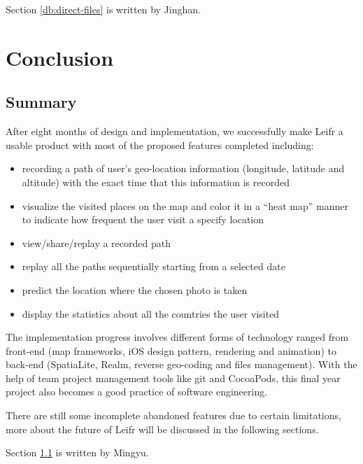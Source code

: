 \documentclass[12pt,a4paper]{article}
\begin{document}
            
            \footnotesize
                Section \ref{db:direct-files} is written by Jinghan.
            \normalsize
    \clearpage
    
    
    \section{Conclusion} 
        \subsection{Summary}
            \label{conclusion:summary}
            After eight months of design and implementation, we successfully make Leifr a usable product with most of the proposed features completed including:
            \begin{itemize}
                \setlength\itemsep{-0.5em}
                \item recording a path of user's geo-location information (longitude, latitude and altitude) with the exact time that this information is recorded
                \item visualize the visited places on the map and color it in a ``heat map'' manner to indicate how frequent the user visit a specify location
                \item view/share/replay a recorded path
                \item replay all the paths sequentially starting from a selected date
                \item predict the location where the chosen photo is taken
                \item display the statistics about all the countries the user visited
            \end{itemize}
            
            The implementation progress involves different forms of technology ranged from front-end (map frameworks, iOS design pattern, rendering and animation) to back-end (SpatiaLite, Realm, reverse geo-coding and files management). With the help of team project management tools like git and CocoaPods, this final year project also becomes a good practice of software engineering.
            
            There are still some incomplete abandoned features due to certain limitations, more about the future of Leifr will be discussed in the following sections.
            
            \footnotesize
                Section \ref{conclusion:summary} is written by Mingyu.
            \normalsize
\end{document}
